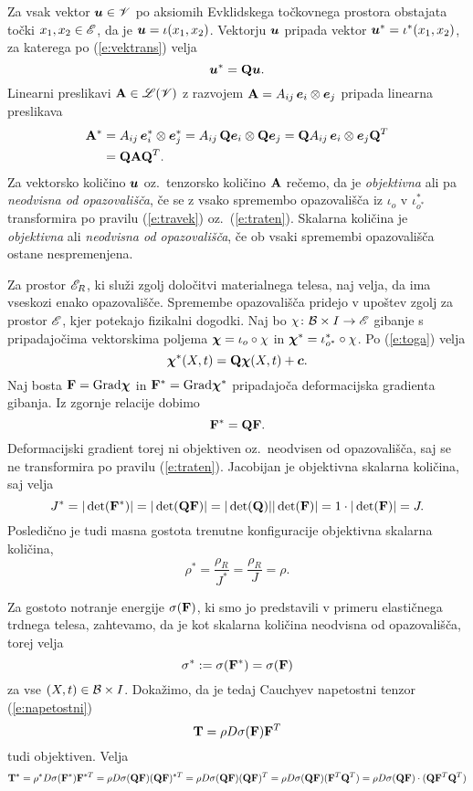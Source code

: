 Za vsak vektor $\boldsymbol u\in\mathscr V$ po aksiomih Evklidskega točkovnega prostora obstajata
točki $x_1,x_2\in\mathscr E$, da je $\boldsymbol u=\iota(x_1,x_2)$. Vektorju $\boldsymbol u$ pripada
vektor $\boldsymbol u^*=\iota^*(x_1,x_2)$, za katerega po (\ref{e:vektrans}) velja
\begin{equation} \label{e:travek}
	\boldsymbol u^*=\mathbf Q\boldsymbol u.
\end{equation}
Linearni preslikavi $\mathbf A\in\mathscr L(\mathscr V)$ z razvojem $\mathbf A=A_{ij}\,\boldsymbol e_i\otimes\boldsymbol e_j$
pripada linearna preslikava
\begin{align}
	\mathbf A^*&=A_{ij}\,\boldsymbol e^*_i\otimes\boldsymbol e^*_j=A_{ij}\,\mathbf Q\boldsymbol e_i\otimes\mathbf Q\boldsymbol e_j
	=\mathbf QA_{ij}\,\boldsymbol e_i\otimes\boldsymbol e_j\mathbf Q^T \nonumber \\
	&=\mathbf Q\mathbf A\mathbf Q^T. \label{e:traten}
\end{align}
Za vektorsko količino $\boldsymbol u$ oz.~tenzorsko količino $\mathbf A$
rečemo, da je \emph{objektivna} ali pa \emph{neodvisna od opazovališča},
če se z vsako spremembo opazovališča iz $\iota_o$ v $\iota^*_{o^*}$
transformira po pravilu (\ref{e:travek}) oz.~(\ref{e:traten}).
Skalarna količina je \emph{objektivna} ali \emph{neodvisna od opazovališča},
če ob vsaki spremembi opazovališča ostane nespremenjena.

Za prostor $\mathscr E_R$, ki služi zgolj določitvi materialnega telesa, naj velja,
da ima vseskozi enako opazovališče. Spremembe opazovališča pridejo v upoštev zgolj
za prostor $\mathscr E$, kjer potekajo fizikalni dogodki. Naj bo $\chi\colon\mathcal B\times I\to\mathscr E$
gibanje s pripadajočima vektorskima poljema $\boldsymbol \chi=\iota_o\circ\chi$ in
$\boldsymbol \chi^*=\iota^*_{o^*}\circ\chi$. Po (\ref{e:toga}) velja
\[
	\boldsymbol \chi^*(X,t)=\mathbf Q\boldsymbol \chi(X,t)+\boldsymbol c.
\]
Naj bosta $\mathbf F=\mathrm{Grad}\boldsymbol \chi$ in $\mathbf F^*=\mathrm{Grad}\boldsymbol \chi^*$ pripadajoča
deformacijska gradienta gibanja. Iz zgornje relacije dobimo
\[
	\mathbf F^*=\mathbf Q\mathbf F.
\]
Deformacijski gradient torej ni objektiven oz.~neodvisen od opazovališča, saj se ne
transformira po pravilu (\ref{e:traten}). Jacobijan je objektivna skalarna
količina, saj velja
\[
	J^*=|\det(\mathbf F^*)|=|\det(\mathbf Q\mathbf F)|=|\det(\mathbf Q)||\det(\mathbf F)|
	=1\cdot|\det(\mathbf F)|=J.
\]
Posledično je tudi masna gostota trenutne konfiguracije objektivna skalarna količina,
\[ \rho^*=\frac{\rho_R}{J^*}=\frac{\rho_R}{J}=\rho. \]

Za gostoto notranje energije $\sigma(\mathbf F)$, ki smo jo predstavili v primeru
elastičnega trdnega telesa, zahtevamo, da je kot skalarna količina neodvisna
od opazovališča, torej velja
\[ \sigma^*:=\sigma(\mathbf F^*)=\sigma(\mathbf F) \]
za vse $(X,t)\in\mathcal B\times I$.
Dokažimo, da je tedaj Cauchyev napetostni tenzor (\ref{e:napetostni})
\[ \mathbf T=\rho D\sigma(\mathbf F)\mathbf F^T \]
tudi objektiven. Velja
\begin{align*}
	\mathbf T^*=\rho^* D\sigma(\mathbf F^*)\mathbf F^{*T}=\rho D\sigma(\mathbf Q\mathbf F)(\mathbf Q\mathbf F)^{*T}
	=\rho D\sigma(\mathbf Q\mathbf F)(\mathbf Q\mathbf F)^{T}=\rho D\sigma(\mathbf Q\mathbf F)(\mathbf F^{T}\mathbf Q^{T})
	=\rho D\sigma(\mathbf Q\mathbf F)\cdot(\mathbf Q\mathbf F^{T}\mathbf Q^{T})
\end{align*}